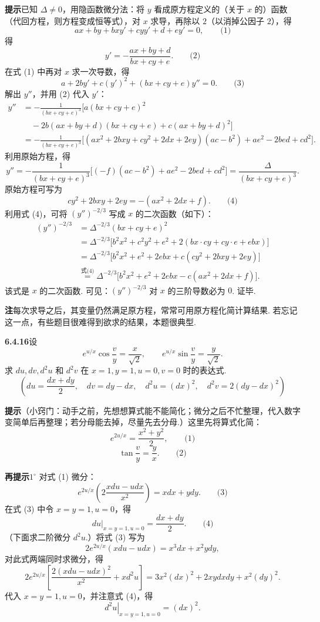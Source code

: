 \documentclass[UTF8, 12pt, fontset=fandol, oneside]{ctexart}
\begin{document}
\noindent\textbf{提示}\quad 已知 $\Delta\ne0$，用隐函数微分法：将 $y$ 看成原方程定义的（关于 $x$ 的）函数（代回方程，则方程变成恒等式），对 $x$ 求导，再除以 $2$（以消掉公因子 $2$），得
\[
  ax+by+bxy'+cyy'+d+ey'=0, \qquad\text{(1)}
\]
得
\[
  y'=-\frac{ax+by+d}{bx+cy+e}. \qquad\text{(2)}
\]
在式 (1) 中再对 $x$ 求一次导数，得
\[
  a+2by'+c(y')^2+(bx+cy+e)y''=0. \qquad\text{(3)}
\]
解出 $y''$，并用 (2) 代入 $y'$：
\[
\begin{aligned}
  y''
  &=-\frac1{(bx+cy+e)^3}
  \bigl[a(bx+cy+e)^2\\
  &\quad -2b(ax+by+d)(bx+cy+e)
  +c(ax+by+d)^2\bigr]\\
  &=-\frac1{(bx+cy+e)^3}
  \bigl[(ax^2+2bxy+cy^2+2dx+2ey)(ac-b^2)
  +ae^2-2bed+cd^2\bigr].
\end{aligned}
\]
利用原始方程，得
\[
  y''=
  -\frac1{(bx+cy+e)^3}
  \bigl[(-f)(ac-b^2)+ae^2-2bed+cd^2\bigr]
  =
  \frac{\Delta}{(bx+cy+e)^3}.
\]
原始方程可写为
\[
  cy^2+2bxy+2ey=-(ax^2+2dx+f). \qquad\text{(4)}
\]
利用式 (4)，可将 $(y'')^{-2/3}$ 写成 $x$ 的二次函数（如下）：
\[
\begin{aligned}
  (y'')^{-2/3}
  &=\Delta^{-2/3}(bx+cy+e)^2\\
  &=\Delta^{-2/3}\bigl[b^2x^2+c^2y^2+e^2+2(bx\cdot cy+cy\cdot e+ebx)\bigr]\\
  &=\Delta^{-2/3}\bigl[b^2x^2+e^2+2ebx+c(cy^2+2bxy+2ey)\bigr]\\
  &\overset{\text{式(4)}}{=}
  \Delta^{-2/3}\bigl[b^2x^2+e^2+2ebx-c(ax^2+2dx+f)\bigr].
\end{aligned}
\]
该式是 $x$ 的二次函数. 可见：$(y'')^{-2/3}$ 对 $x$ 的三阶导数必为 $0$. 证毕.

\noindent\textbf{注}\quad 每次求导之后，其变量仍然满足原方程，常常可用原方程化简计算结果. 若忘记这一点，有些题目很难得到欲求的结果，本题很典型.

\noindent\textbf{6.4.16}\quad 设
\[
  e^{u/x}\cos\frac vy=\frac{x}{\sqrt2},\qquad
  e^{u/x}\sin\frac vy=\frac{y}{\sqrt2}.
\]
求 $du,dv,d^2u$ 和 $d^2v$ 在 $x=1,y=1,u=0,v=0$ 时的表达式.
\[
  \left(du=\frac{dx+dy}{2},\quad dv=dy-dx,\quad
  d^2u=(dx)^2,\quad d^2v=2(dy-dx)^2\right)
\]

\noindent\textbf{提示}\quad （小窍门：动手之前，先想想算式能不能简化；微分之后不忙整理，代入数字变简单后再整理；若分母能去掉，尽量先去分母.）这里先将算式化简：
\[
  e^{2u/x}=\frac{x^2+y^2}{2}, \qquad\text{(1)}
\]
\[
  \tan\frac vy=\frac yx. \qquad\text{(2)}
\]

\noindent\textbf{再提示}\quad $1^\circ$ 对式 (1) 微分：
\[
  e^{2u/x}\left(2\frac{xdu-udx}{x^2}\right)=xdx+ydy. \qquad\text{(3)}
\]
在式 (3) 中令 $x=y=1,u=0$，得
\[
  \left.du\right|_{x=y=1,u=0}=\frac{dx+dy}{2}. \qquad\text{(4)}
\]
（下面求二阶微分 $d^2u$.）将式 (3) 写为
\[
  2e^{2u/x}(xdu-udx)=x^3dx+x^2ydy,
\]
对此式两端同时求微分，得
\[
  2e^{2u/x}\left[\frac{2(xdu-udx)^2}{x^2}+xd^2u\right]
  =
  3x^2(dx)^2+2xydxdy+x^2(dy)^2.
\]
代入 $x=y=1,u=0$，并注意式 (4)，得
\[
  \left.d^2u\right|_{x=y=1,u=0}=(dx)^2.
\]
\end{document}
